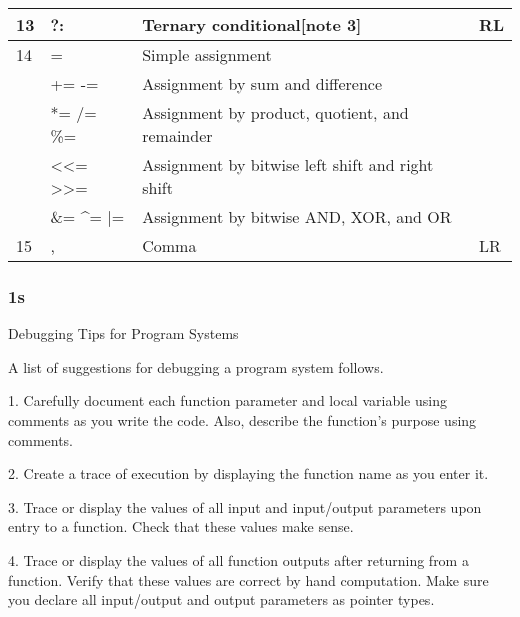 \documentclass{extarticle}
\begin{document}
\begin{multicols}{4}
\begin{tabular}{|l|l|l|l|}
13             & ?:                                                    & Ternary conditional{[}note 3{]}                                        & RL            \\ \hline
14 & =                                                     & Simple assignment                                                      &               \\
               & += -=                                                 & Assignment by sum and difference                                       &               \\
               & *= /= \%=                                             & Assignment by product, quotient, and remainder                         &               \\
               & \textless{}\textless{}= \textgreater{}\textgreater{}= & Assignment by bitwise left shift and right shift                       &               \\
               & \&= \textasciicircum{}= |=                            & Assignment by bitwise AND, XOR, and OR                                 &               \\ \hline
15             & ,                                                     & Comma                                                                  & LR            \\ \hline
\end{tabular}


\subsubsection{1s}

Debugging Tips for Program Systems

A list of suggestions for debugging a program system follows.

1. Carefully document each function parameter and local variable using comments as you write the code. Also, describe the function’s purpose using comments.

2. Create a trace of execution by displaying the function name as you enter it.

3. Trace or display the values of all input and input/output parameters upon entry to a function. Check that these values make sense.

4. Trace or display the values of all function outputs after returning from a function. Verify that these values are correct by hand computation. Make sure you declare all input/output and output parameters as pointer types.


\end{multicols}
\end{document}
